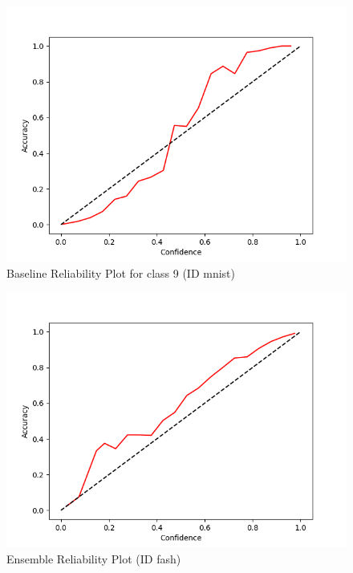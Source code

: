 \documentclass[11pt]{article}
\begin{document}
\begin{figure}[htbp]
\centering
\includegraphics[width=.9\linewidth]{./base_mnist_rel_9.png}
\caption{\label{fig:org50c142f}
Baseline Reliability Plot for class 9 (ID mnist)}
\end{figure}

\begin{figure}[htbp]
\centering
\includegraphics[width=.9\linewidth]{./ens_fash_total_rel.png}
\caption{\label{fig:orga2055a7}
Ensemble Reliability Plot (ID fash)}
\end{figure}
\end{document}
